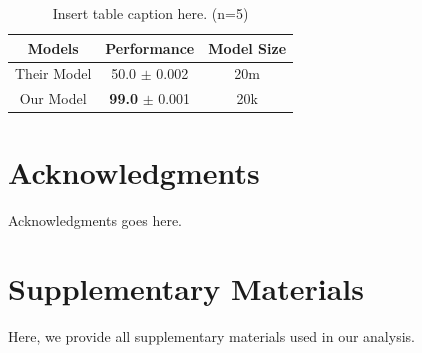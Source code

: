 \documentclass{MITcsail}
\begin{document}
\begin{table}[h]
    \centering
    \small
    \caption{Insert table caption here. (n=5)}
    \begin{tabular}{ccc}
        \toprule
         \textbf{Models} & \textbf{Performance} & \textbf{Model Size} \\
         \midrule
         Their Model & 50.0 $\pm$ 0.002 & 20m \\
         Our Model & \textbf{99.0} $\pm$ 0.001 & 20k \\
        \bottomrule
    \end{tabular}
    \label{tab:my_label}
\end{table}






\section*{Acknowledgments} 
Acknowledgments goes here.


\clearpage
\beginsupplement

\section{Supplementary Materials}
Here, we provide all supplementary materials used in our analysis. 
\end{document}
